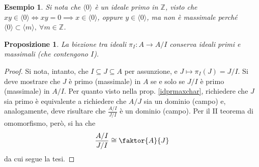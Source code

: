 \documentclass[12pt]{scrartcl}
\theoremstyle{style}
\newtheorem{esempio}{Esempio}[section]
\newtheorem{prop}{Proposizione}[section]
\numberwithin{equation}{subsection}
\begin{document}
\begin{esempio}
Si nota che $\langle 0 \rangle $ \`e un ideale primo in $\mathbb{Z}$, visto che $xy \in \langle 0 \rangle \iff xy = 0\implies x \in \langle 0 \rangle$, oppure $y \in \langle 0 \rangle$, ma non \`e massimale perch\'e $\langle 0 \rangle\subset \langle m \rangle  , \ \forall m \in \mathbb{Z}$.
\end{esempio}
\begin{prop}
	La biezione tra ideali $\pi_I : A \to A/I$ conserva ideali primi e massimali (che contengono $I$).
\end{prop}
	\begin{proof}
		Si nota, intanto, che $I \subseteq J \subseteq A$ per assunzione, e $J\longmapsto \pi_I(J) = J / I$.
		Si deve mostrare che $J$ \`e primo (massimale) in $A$ se e solo se $J / I$ \`e primo (massimale) in $A / I$.
		Per quanto visto nella prop. \ref{idprmaxchar}, richiedere che $J $ sia primo \`e equivalente a richiedere che $A / J$ sia un dominio (campo) e, analogamente, deve risultare che $\frac{A / I}{J / I}$ \`e un dominio (campo).
		Per il II teorema di omomorfismo, per\`o, si ha che
		\[
			\frac{A / I }{J / I}\cong \faktor{A}{J}
		\] 
		da cui segue la tesi.
	\end{proof}
\end{document}
